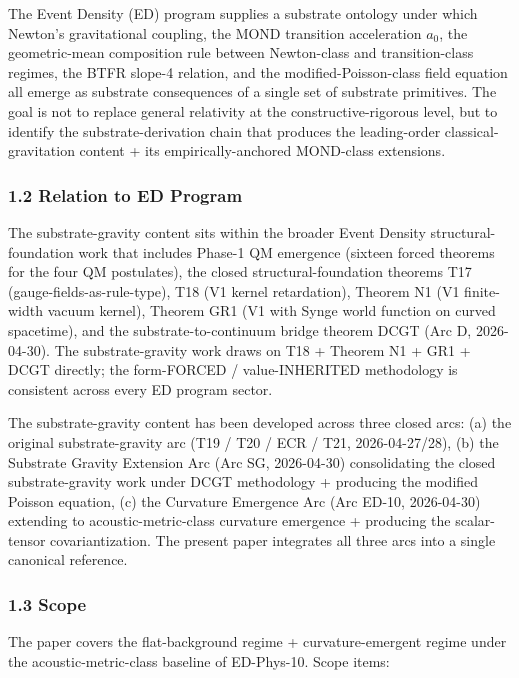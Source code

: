 \documentclass[
]{article}
\begin{document}
The Event Density (ED) program supplies a substrate ontology under which
Newton's gravitational coupling, the MOND transition acceleration
\(a_0\), the geometric-mean composition rule between Newton-class and
transition-class regimes, the BTFR slope-4 relation, and the
modified-Poisson-class field equation all emerge as substrate
consequences of a single set of substrate primitives. The goal is not to
replace general relativity at the constructive-rigorous level, but to
identify the substrate-derivation chain that produces the leading-order
classical-gravitation content + its empirically-anchored MOND-class
extensions.

\subsubsection{1.2 Relation to ED Program}\label{relation-to-ed-program}

The substrate-gravity content sits within the broader Event Density
structural-foundation work that includes Phase-1 QM emergence (sixteen
forced theorems for the four QM postulates), the closed
structural-foundation theorems T17 (gauge-fields-as-rule-type), T18 (V1
kernel retardation), Theorem N1 (V1 finite-width vacuum kernel), Theorem
GR1 (V1 with Synge world function on curved spacetime), and the
substrate-to-continuum bridge theorem DCGT (Arc D, 2026-04-30). The
substrate-gravity work draws on T18 + Theorem N1 + GR1 + DCGT directly;
the form-FORCED / value-INHERITED methodology is consistent across every
ED program sector.

The substrate-gravity content has been developed across three closed
arcs: (a) the original substrate-gravity arc (T19 / T20 / ECR / T21,
2026-04-27/28), (b) the Substrate Gravity Extension Arc (Arc SG,
2026-04-30) consolidating the closed substrate-gravity work under DCGT
methodology + producing the modified Poisson equation, (c) the Curvature
Emergence Arc (Arc ED-10, 2026-04-30) extending to acoustic-metric-class
curvature emergence + producing the scalar-tensor covariantization. The
present paper integrates all three arcs into a single canonical
reference.

\subsubsection{1.3 Scope}\label{scope}

The paper covers the flat-background regime + curvature-emergent regime
under the acoustic-metric-class baseline of ED-Phys-10. Scope items:
\end{document}
